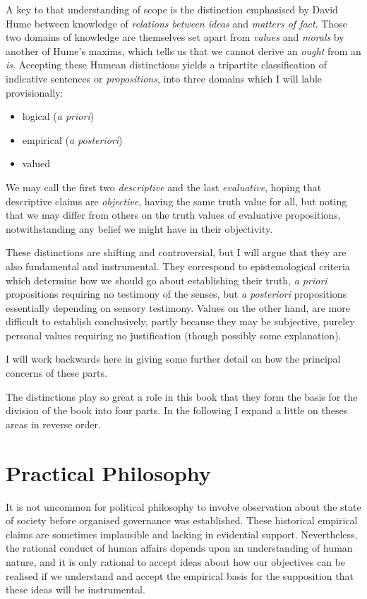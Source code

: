 A key to that understanding of scope is the distinction emphasised by David Hume between knowledge of \emph{relations between ideas} and \emph{matters of fact}.
Those two domains of knowledge are themselves set apart from \emph{values} and \emph{morals} by another of Hume's maxims, which tells us that we cannot derive an \emph{ought} from an \emph{is}.
Accepting these Humean distinctions yields a tripartite classification of indicative sentences or \emph{propositions}, into three domains which I will lable provisionally:

\begin{itemize}
\item[]logical (\emph{a priori})
\item[]empirical (\emph{a posteriori})
\item[]valued
\end{itemize}

We may call the first two \emph{descriptive} and the last \emph{evaluative}, hoping that descriptive claims are \emph{objective}, having the same truth value for all, but noting that we may differ from others on the truth values of evaluative propositions, notwithstanding any belief we might have in their objectivity.

These distinctions are shifting and controversial, but I will argue that they are also fundamental and instrumental.
They correspond to epistemological criteria which determine how we should go about establishing their truth, \emph{a priori} propositions requiring no testimony of the senses, but \emph{a posteriori} propositions essentially depending on sensory testimony.
Values on the other hand, are more difficult to establish conclusively, partly because they may be subjective, pureley personal values requiring no justification (though possibly some explanation).

I will work backwards here in giving some further detail on how the principal concerns of these parts.

The distinctions play so great a role in this book that they form the basis for the division of the book into four parts.
In the following I expand a little on theses areas in reverse order.

\section{Practical Philosophy}


It is not uncommon for political philosophy to involve observation about the state of society before organised governance was established.
These historical empirical claims are sometimes implausible and lacking in evidential support.
Nevertheless, the rational conduct of human affairs depends upon an understanding of human nature, and it is only rational to accept ideas about how our objectives can be realised if we understand and accept the empirical basis for the supposition that these ideas will be instrumental.



